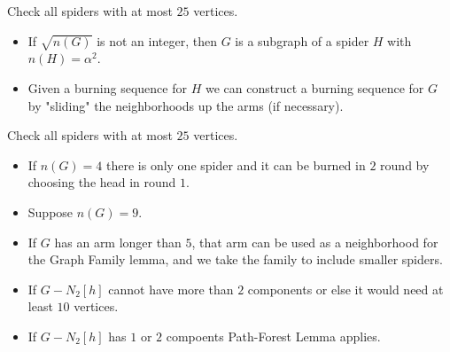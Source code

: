 \documentclass{beamer}
\begin{document}
\begin{frame}{Check all spiders with at most $25$ vertices.}
\begin{itemize}
\item If $\sqrt{n(G)}$ is not an integer, then $G$ is a subgraph of a spider $H$ with $n(H) = \alpha^2$.\\
\item Given a burning sequence for $H$ we can construct a burning sequence for $G$ by "sliding" the neighborhoods up the arms (if necessary).
\end{itemize}
\end{frame}

\begin{frame}{Check all spiders with at most $25$ vertices.}
\begin{itemize}
\item If $n(G)=4$ there is only one spider and it can be burned in $2$ round by choosing the head in round $1$.
\item Suppose $n(G) = 9$.
\item If $G$ has an arm longer than $5$, that arm can be used as a neighborhood for the Graph Family lemma, and we take the family to include smaller spiders.
\item If $G - N_2[h]$ cannot have more than $2$ components or else it would need at least $10$ vertices.
\item If $G - N_2[h]$ has $1$ or $2$ compoents Path-Forest Lemma applies.
\end{itemize}
\end{frame}
\end{document}
